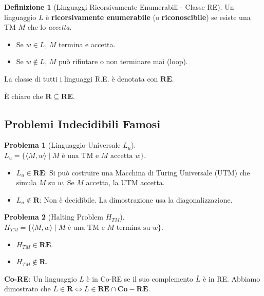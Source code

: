 \documentclass[a4paper]{article}
\theoremstyle{definition} %
\newtheorem{definition}{Definizione}
\newtheorem{problem}{Problema}[section]
\newcommand{\tuple}[1]{\langle#1\rangle}
\begin{document}
\begin{definition}[Linguaggi Ricorsivamente Enumerabili - Classe RE]
Un linguaggio $L$ è \textbf{ricorsivamente enumerabile} (o \textbf{riconoscibile}) se esiste una TM $M$ che lo \emph{accetta}.
\begin{itemize}
    \item Se $w \in L$, $M$ termina e accetta.
    \item Se $w \notin L$, $M$ può rifiutare o non terminare mai (loop).
\end{itemize}
La classe di tutti i linguaggi R.E. è denotata con $\mathbf{RE}$.
\end{definition}
È chiaro che $\mathbf{R} \subseteq \mathbf{RE}$.

\subsection{Problemi Indecidibili Famosi}
\begin{problem}[Linguaggio Universale $L_u$]
$L_u = \{ \tuple{M, w} \mid M \text{ è una TM e } M \text{ accetta } w \}$.
\begin{itemize}
    \item $L_u \in \mathbf{RE}$: Si può costruire una Macchina di Turing Universale (UTM) che simula $M$ su $w$. Se $M$ accetta, la UTM accetta.
    \item $L_u \notin \mathbf{R}$: Non è decidibile. La dimostrazione usa la diagonalizzazione.
\end{itemize}
\end{problem}
\begin{problem}[Halting Problem $H_{TM}$]
$H_{TM} = \{ \tuple{M, w} \mid M \text{ è una TM e } M \text{ termina su } w \}$.
\begin{itemize}
    \item $H_{TM} \in \mathbf{RE}$.
    \item $H_{TM} \notin \mathbf{R}$.
\end{itemize}
\end{problem}
\textbf{Co-RE}: Un linguaggio $L$ è in Co-RE se il suo complemento $\bar{L}$ è in RE. Abbiamo dimostrato che $L \in \mathbf{R} \iff L \in \mathbf{RE} \cap \mathbf{Co-RE}$.
\end{document}
